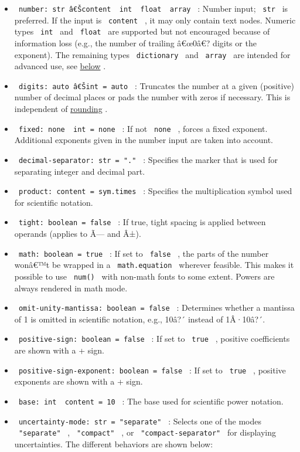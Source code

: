 \begin{itemize}
\tightlist
\item
  \texttt{\ number:\ str\ \textbar{}â€Šcontent\ \textbar{}\ int\ \textbar{}\ float\ \textbar{}\ array\ }
  : Number input; \texttt{\ str\ } is preferred. If the input is
  \texttt{\ content\ } , it may only contain text nodes. Numeric types
  \texttt{\ int\ } and \texttt{\ float\ } are supported but not
  encouraged because of information loss (e.g., the number of trailing
  â€œ0â€? digits or the exponent). The remaining types
  \texttt{\ dictionary\ } and \texttt{\ array\ } are intended for
  advanced use, see
  \href{https://github.com/typst/packages/raw/main/packages/preview/zero/0.3.0/\#zero-for-third-party-packages}{below}
  .
\item
  \texttt{\ digits:\ auto\ \textbar{}â€Šint\ =\ auto\ } : Truncates the
  number at a given (positive) number of decimal places or pads the
  number with zeros if necessary. This is independent of
  \href{https://github.com/typst/packages/raw/main/packages/preview/zero/0.3.0/\#rounding}{rounding}
  .
\item
  \texttt{\ fixed:\ none\ \textbar{}\ int\ =\ none\ } : If not
  \texttt{\ none\ } , forces a fixed exponent. Additional exponents
  given in the number input are taken into account.
\item
  \texttt{\ decimal-separator:\ str\ =\ "."\ } : Specifies the marker
  that is used for separating integer and decimal part.
\item
  \texttt{\ product:\ content\ =\ sym.times\ } : Specifies the
  multiplication symbol used for scientific notation.
\item
  \texttt{\ tight:\ boolean\ =\ false\ } : If true, tight spacing is
  applied between operands (applies to Ã--- and Â±).
\item
  \texttt{\ math:\ boolean\ =\ true\ } : If set to \texttt{\ false\ } ,
  the parts of the number wonâ€™t be wrapped in a
  \texttt{\ math.equation\ } wherever feasible. This makes it possible
  to use \texttt{\ num()\ } with non-math fonts to some extent. Powers
  are always rendered in math mode.
\item
  \texttt{\ omit-unity-mantissa:\ boolean\ =\ false\ } : Determines
  whether a mantissa of 1 is omitted in scientific notation, e.g., 10â?´
  instead of 1Â·10â?´.
\item
  \texttt{\ positive-sign:\ boolean\ =\ false\ } : If set to
  \texttt{\ true\ } , positive coefficients are shown with a + sign.
\item
  \texttt{\ positive-sign-exponent:\ boolean\ =\ false\ } : If set to
  \texttt{\ true\ } , positive exponents are shown with a + sign.
\item
  \texttt{\ base:\ int\ \textbar{}\ content\ =\ 10\ } : The base used
  for scientific power notation.
\item
  \texttt{\ uncertainty-mode:\ str\ =\ "separate"\ } : Selects one of
  the modes \texttt{\ "separate"\ } , \texttt{\ "compact"\ } , or
  \texttt{\ "compact-separator"\ } for displaying uncertainties. The
  different behaviors are shown below:
\end{itemize}


